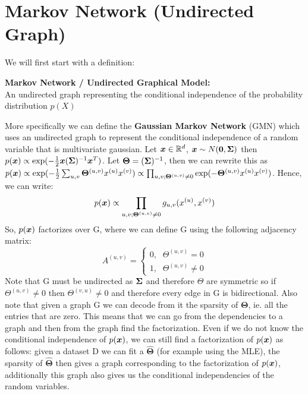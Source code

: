 \section{Markov Network (Undirected Graph)}
We will first start with a definition:
\begin{definition}
    \textbf{Markov Network / Undirected Graphical Model:} \\
    An undirected graph representing the conditional independence of the probability distribution $p(X)$
\end{definition}
More specifically we can define the \textbf{Gaussian Markov Network} (GMN) which uses an undirected graph to represent the conditional independence of a random variable that is multivariate gaussian. Let $\bm{x} \in \mathbb{R}^{d}$, $\bm{x} \sim N(\bm{0},\bm{\Sigma})$ then $p(\bm{x}) \propto \exp(-\frac{1}{2} \bm{x}(\bm{\Sigma})^{-1} \bm{x}^{T})$. Let $\bm{\Theta} = (\bm{\Sigma})^{-1}$, then we can rewrite this as $p(\bm{x}) \propto \exp (-\frac{1}{2} \sum_{u,v} \bm{\Theta}^{(u,v)} x^{(u)} x^{(v)}) \propto \prod_{u,v; \bm{\Theta}^{(u,v)} \neq 0} \exp(-\bm{\Theta}^{(u,v)} x^{(u)} x^{(v)})$. Hence, we can write:
\begin{equation}
    p(\bm{x}) \propto \prod_{u,v; \bm{\Theta}^{(u,v)} \neq 0} g_{u,v} (x^{(u)}, x^{(v)})
\end{equation}
So, $p(\bm{x})$ factorizes over G, where we can define G using the following adjacency matrix:
\begin{equation}\label{equation:adjacency-Theta}
    A^{(u,v)} =  \begin{cases} \mbox{0,} & \Theta^{(u,v)} =0 \\ \mbox{1,} & \Theta^{(u,v)} \neq 0 \end{cases}
\end{equation}
Note that G must be undirected as $\bm{\Sigma}$ and therefore $\Theta$ are symmetric so if $\Theta^{(u,v)} \neq 0$ then $\Theta^{(v,u)} \neq 0$ and therefore every edge in G is bidirectional. Also note that given a graph G we can decode from it the sparsity of $\bm{\Theta}$, ie. all the entries that are zero. This means that we can go from the dependencies to a graph and then from the graph find the factorization. Even if we do not know the conditional independence of $p(\bm{x})$, we can still find a factorization of $p(\bm{x})$ as follows: given a dataset D we can fit a $\hat{\bm{\Theta}}$ (for example using the MLE), the sparsity of $\hat{\bm{\Theta}}$ then gives a graph corresponding to the factorization of $p(\bm{x})$, additionally this graph also gives us the conditional independencies of the random variables. 

